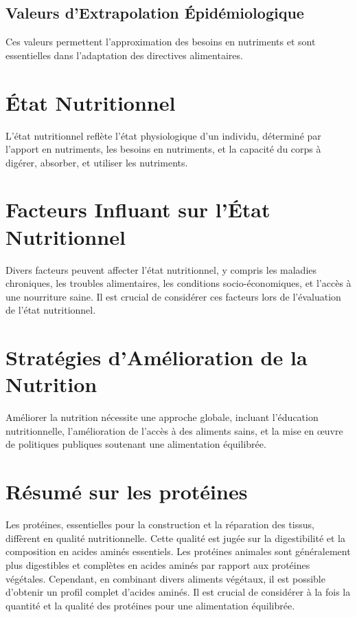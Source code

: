 \documentclass[11pt]{article}
\begin{document}
\subsection{Valeurs d'Extrapolation Épidémiologique}
Ces valeurs permettent l'approximation des besoins en nutriments et sont essentielles dans l'adaptation des directives alimentaires.

\section{État Nutritionnel}
L'état nutritionnel reflète l'état physiologique d'un individu, déterminé par l'apport en nutriments, les besoins en nutriments, et la capacité du corps à digérer, absorber, et utiliser les nutriments.

\section{Facteurs Influant sur l'État Nutritionnel}
Divers facteurs peuvent affecter l'état nutritionnel, y compris les maladies chroniques, les troubles alimentaires, les conditions socio-économiques, et l'accès à une nourriture saine. Il est crucial de considérer ces facteurs lors de l'évaluation de l'état nutritionnel.

\section{Stratégies d'Amélioration de la Nutrition}
Améliorer la nutrition nécessite une approche globale, incluant l'éducation nutritionnelle, l'amélioration de l'accès à des aliments sains, et la mise en œuvre de politiques publiques soutenant une alimentation équilibrée.
\section{Résumé sur les protéines}

Les protéines, essentielles pour la construction et la réparation des tissus, diffèrent en qualité nutritionnelle. Cette qualité est jugée sur la digestibilité et la composition en acides aminés essentiels. Les protéines animales sont généralement plus digestibles et complètes en acides aminés par rapport aux protéines végétales. Cependant, en combinant divers aliments végétaux, il est possible d'obtenir un profil complet d'acides aminés. Il est crucial de considérer à la fois la quantité et la qualité des protéines pour une alimentation équilibrée.
\end{document}
